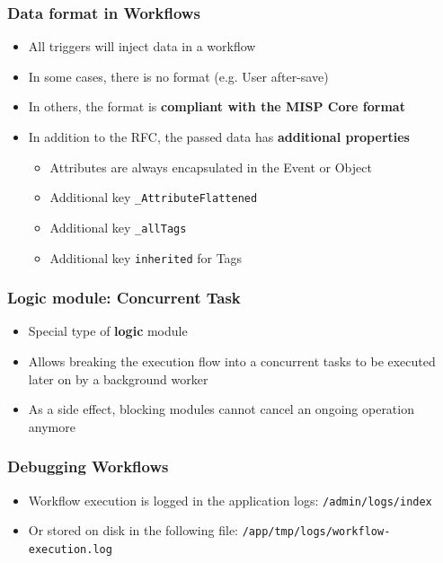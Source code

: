 \begin{frame}
    \frametitle{Data format in Workflows}
    \begin{itemize}
        \item All triggers will inject data in a workflow
        \item In some cases, there is no format (e.g. User after-save)
        \item In others, the format is \textbf{compliant with the MISP Core format}
        \item In addition to the RFC, the passed data has \textbf{additional properties}
        \begin{itemize}
            \item Attributes are always encapsulated in the Event or Object
            \item Additional key \texttt{\_AttributeFlattened}
            \item Additional key \texttt{\_allTags}
            \item Additional key \texttt{inherited} for Tags
        \end{itemize}
    \end{itemize}
\end{frame}

\begin{frame}
    \frametitle{Logic module: Concurrent Task}
    \begin{itemize}
        \item Special type of \textbf{logic} module
        \item Allows breaking the execution flow into a concurrent tasks to be executed later on by a background worker
        \item As a side effect, blocking modules cannot cancel an ongoing operation anymore
    \end{itemize}
\end{frame}

\begin{frame}
    \frametitle{Debugging Workflows}
    \begin{itemize}
        \item Workflow execution is logged in the application logs: \texttt{/admin/logs/index}
        \item Or stored on disk in the following file: \texttt{/app/tmp/logs/workflow-execution.log}
    \end{itemize}
\end{frame}

